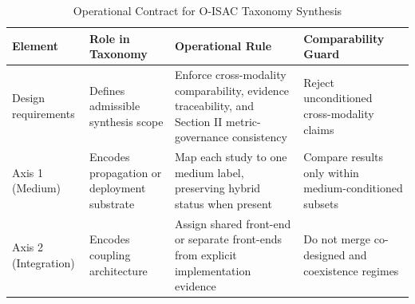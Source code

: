 \begin{table}[!t]
    \caption{Operational Contract for O-ISAC Taxonomy Synthesis}
    \label{tab:taxonomy_contract}
    \centering
    \footnotesize
    \begin{tabularx}{\textwidth}{@{}>{\raggedright\arraybackslash}p{2.15cm} >{\raggedright\arraybackslash}X >{\raggedright\arraybackslash}X >{\raggedright\arraybackslash}X@{}}
        \toprule
        \textbf{Element}                                                                                          &
        \textbf{Role in Taxonomy}                                                                                 &
        \textbf{Operational Rule}                                                                                 &
        \textbf{Comparability Guard}                                                                                \\
        \midrule

        Design requirements                                                                                       &
        Defines admissible synthesis scope                                                                        &
        Enforce cross-modality comparability, evidence traceability, and Section II metric-governance consistency &
        Reject unconditioned cross-modality claims                                                                  \\

        Axis 1 (Medium)                                                                                           &
        Encodes propagation or deployment substrate                                                               &
        Map each study to one medium label, preserving hybrid status when present                                 &
        Compare results only within medium-conditioned subsets                                                      \\

        Axis 2 (Integration)                                                                                      &
        Encodes coupling architecture                                                                             &
        Assign shared front-end or separate front-ends from explicit implementation evidence                      &
        Do not merge co-designed and coexistence regimes                                                            \\


\end{tabularx}
\end{table}
